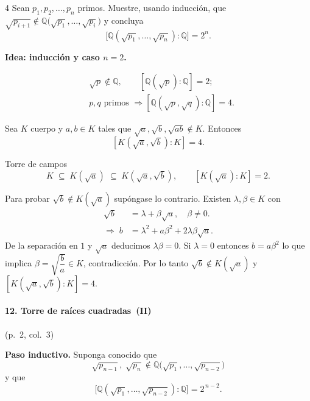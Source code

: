 \documentclass[landscape,a4paper]{article}
\begin{document}
\begin{multicols}{4}
Sea\-n $p_{1},p_{2},\dots,p_{n}$ primos.  Muestre, usando inducción, que 
$\sqrt{p_{i+1}}\notin\mathbb{Q}\bigl(\sqrt{p_{1}},\dots,\sqrt{p_{i}}\bigr)$ y concluya 
\[
\bigl[\mathbb{Q}(\sqrt{p_{1}},\dots,\sqrt{p_{n}}):\mathbb{Q}\bigr]=2^{n}.
\]

\noindent\textbf{Idea: inducción y caso $n=2$.}

\begin{align}
&\sqrt{p}\notin\mathbb{Q}, \qquad [\mathbb{Q}(\sqrt{p}):\mathbb{Q}]=2;\\
&p,q\text{ primos } \Longrightarrow 
   [\mathbb{Q}(\sqrt{p},\sqrt{q}):\mathbb{Q}]=4. \tag*{(p.~2, col.~2)}
\end{align}

\begin{tcolorbox}[colback=white,colframe=blue!80!black,
                  colbacktitle=blue!80!black,coltitle=white,
                  title={Afirmación (p.~2, col.~2)}]
Sea $K$ cuerpo y $a,b\in K$ tales que 
$\sqrt{a},\sqrt{b},\sqrt{ab}\notin K$.  
Entonces
\[
[K(\sqrt{a},\sqrt{b}):K]=4.
\]
\end{tcolorbox}

\noindent Torre de campos
\[
K \;\subseteq\; K(\sqrt{a}) \;\subseteq\; K(\sqrt{a},\sqrt{b}),
\qquad [K(\sqrt{a}):K]=2.
\]

Para probar $\sqrt{b}\notin K(\sqrt{a})$ supóngase lo contrario.  
Existen $\lambda,\beta\in K$ con
\begin{align}
\sqrt{b} &= \lambda + \beta\sqrt{a}, \quad \beta\neq0.\\
\Rightarrow\;
b &= \lambda^{2}+a\beta^{2}+2\lambda\beta\sqrt{a}. \tag*{(p.~2, col.~2)}
\end{align}
De la separación en $1$ y $\sqrt{a}$ deducimos $\lambda\beta=0$.
Si $\lambda=0$ entonces $b=a\beta^{2}$ lo que implica $\beta=\sqrt{\dfrac{b}{a}}\in K$, contradicción.  
Por lo tanto $\sqrt{b}\notin K(\sqrt{a})$ y $[K(\sqrt{a},\sqrt{b}):K]=4$.
\paragraph{12. Torre de raíces cuadradas (II)}\hfill(p.~2, col.~3)

\noindent\textbf{Paso inductivo.}  Suponga conocido que
\[
\sqrt{p_{n-1}},\;\sqrt{p_{n}}\notin\mathbb{Q}\bigl(\sqrt{p_{1}},\dots,\sqrt{p_{n-2}}\bigr)
\]
y que
\[
\bigl[\mathbb{Q}(\sqrt{p_{1}},\dots,\sqrt{p_{n-2}}):\mathbb{Q}\bigr]=2^{\,n-2}.
\]


\end{multicols}
\end{document}
